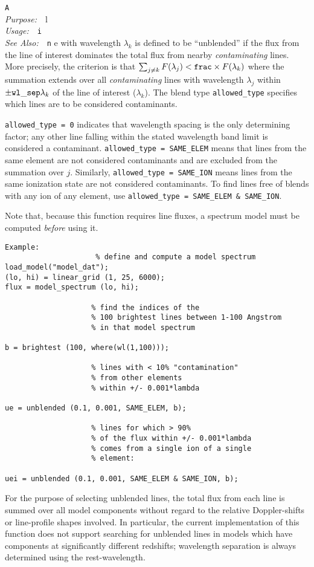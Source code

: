 \documentclass{book}
\makeatletter
\newif\ifpdf
\newenvironment{isisfunction}[4]%
{\index{{#1}@{\tt #1}}%
  \ifpdf
  \else
     \addcontentsline{toc}{subsection}{{#1} -- {#2}}
  \fi
  \vbox{
          \vspace*{\baselineskip}
          {\LARGE\tt #1}\vspace*{\baselineskip}\\
          {{\it Purpose:}~~{#2}}\\
          {{\it Usage:}~~{\tt #3}}\\
          {{\it See Also:}~~{\tt #4}}
       }
}%
{ }
\makeatother
\begin{document}
{\begin{isisfunction}
A line with wavelength $\lambda_k$ is defined to be ``unblended'' if the
flux from the line of interest dominates the total flux from nearby {\it
contaminating} lines.  More precisely, the criterion is that $\sum_{j
\neq k} F(\lambda_j) < {\tt frac}\times F(\lambda_k)$ where the summation
extends over all {\it contaminating} lines with wavelength $\lambda_j$
within $\pm {\tt wl\_sep}\lambda_k$ of the line of interest ($\lambda_k$).
The blend type {\tt allowed\_type} specifies which lines are to be
considered contaminants.

{\tt allowed\_type = 0} indicates that wavelength spacing is the only
determining factor; any other line falling within the stated wavelength band
limit is considered a contaminant. {\tt allowed\_type = SAME\_ELEM} means
that lines from the same element are not considered contaminants and are
excluded from the summation over $j$.  Similarly, {\tt allowed\_type =
SAME\_ION} means lines from the same ionization state are not considered
contaminants. To find lines free of blends with any ion of any element, use
{\tt allowed\_type = SAME\_ELEM \& SAME\_ION}.

Note that, because this function requires line fluxes, a spectrum
model must be computed {\it before} using it.

\begin{verbatim}
Example:
                     % define and compute a model spectrum
load_model("model_dat");
(lo, hi) = linear_grid (1, 25, 6000);
flux = model_spectrum (lo, hi);

                    % find the indices of the
                    % 100 brightest lines between 1-100 Angstrom
                    % in that model spectrum

b = brightest (100, where(wl(1,100)));

                    % lines with < 10% "contamination"
                    % from other elements
                    % within +/- 0.001*lambda

ue = unblended (0.1, 0.001, SAME_ELEM, b);

                    % lines for which > 90%
                    % of the flux within +/- 0.001*lambda
                    % comes from a single ion of a single
                    % element:

uei = unblended (0.1, 0.001, SAME_ELEM & SAME_ION, b);

\end{verbatim}

For the purpose of selecting unblended lines, the total flux from each line
is summed over all model components without regard to the relative
Doppler-shifts or line-profile shapes involved. In particular, the current
implementation of this function does not support searching for unblended
lines in models which have components at significantly different redshifts;
wavelength separation is always determined using the rest-wavelength.
\end{isisfunction}

}
\end{document}
